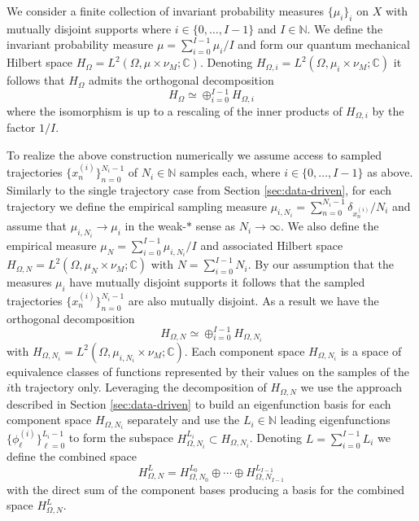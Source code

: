 \documentclass[letterpaper,10pt,3p,preprint]{elsarticle}
\newcommand{\Nbb}{\mathbb{N}}
\newcommand{\Cbb}{\mathbb{C}}
\begin{document}
We consider a finite collection of invariant probability
measures $\{\mu_i\}_i$ on $X$ with mutually disjoint supports
where $i\in\{0,\ldots,I-1\}$ and $I\in\Nbb$.
We define the invariant probability measure
$\mu=\sum_{i=0}^{I-1}\mu_i/I$
and form our quantum mechanical Hilbert space
$H_\Omega=L^2(\Omega,\mu\times\nu_M;\Cbb)$.
Denoting $H_{\Omega,i}=L^2(\Omega,\mu_i\times\nu_M;\Cbb)$
it follows that $H_\Omega$ admits the orthogonal decomposition
\begin{equation*}
    H_\Omega\simeq\oplus_{i=0}^{I-1}H_{\Omega,i}
\end{equation*}
where the isomorphism is up to a rescaling of the inner products
of $H_{\Omega,i}$ by the factor $1/I$.


To realize the above construction numerically we assume access
to sampled trajectories $\{x_n^{(i)}\}_{n=0}^{N_i-1}$
of $N_i\in\Nbb$ samples each, where
$i\in\{0,\ldots,I-1\}$ as above.
Similarly to the single trajectory case from
Section \ref{sec:data-driven},
for each trajectory we define the empirical sampling measure
$\mu_{i,N_i}=\sum_{n=0}^{N_i-1}\delta_{x_n^{(i)}}/N_i$
and assume that $\mu_{i,N_i}\to\mu_i$
in the weak-$*$ sense as $N_i\to\infty$.
We also define the empirical measure
$\mu_N=\sum_{i=0}^{I-1}\mu_{i,N_i}/I$
and associated Hilbert space
$H_{\Omega,N}=L^2(\Omega,\mu_N\times\nu_M;\Cbb)$
with $N=\sum_{i=0}^{I-1}N_i$.
By our assumption that the measures $\mu_i$ have mutually disjoint
supports it follows that the sampled trajectories
$\{x_n^{(i)}\}_{n=0}^{N_i-1}$ are also mutually disjoint.
As a result we have the orthogonal decomposition
\begin{equation*}
    H_{\Omega,N}\simeq\oplus_{i=0}^{I-1}H_{\Omega,N_i}
\end{equation*}
with
$H_{\Omega,N_i}=L^2(\Omega,\mu_{i,N_i}\times\nu_M;\Cbb)$.
Each component space $H_{\Omega,N_i}$ is a space of equivalence
classes of functions represented by their values on the samples
of the $i$th trajectory only.
Leveraging the decomposition of $H_{\Omega,N}$
we use the approach described in Section \ref{sec:data-driven}
to build an eigenfunction basis for each component space
$H_{\Omega,N_i}$ separately and use the
$L_i\in\Nbb$ leading eigenfunctions
$\{\phi_\ell^{(i)}\}_{\ell=0}^{L_i-1}$
to form the subspace
$H_{\Omega,N_i}^{L_i}\subset H_{\Omega,N_i}$.
Denoting $L=\sum_{i=0}^{I-1}L_i$
we define the combined space
\begin{equation*}
    H_{\Omega,N}^L=H_{\Omega,N_0}^{L_0}\oplus\cdots\oplus
        H_{\Omega,N_{I-1}}^{L_{I-1}}
\end{equation*}
with the direct sum of the component bases producing a basis
for the combined space $H_{\Omega,N}^L$.
\end{document}
